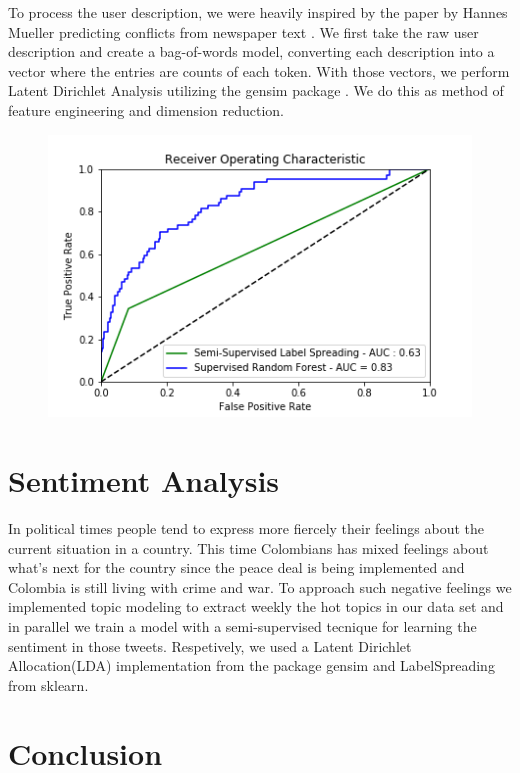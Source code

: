 \documentclass[10pt,a4paper]{article} %
\begin{document}
		To process the user description, we were heavily inspired by the paper by Hannes Mueller predicting conflicts from newspaper text \cite{mueller_rauh_2018}.  We first take the raw user description and create a bag-of-words model, converting each description into a vector where the entries are counts of each token.  With those vectors, we perform Latent Dirichlet Analysis utilizing the gensim package \cite{rehurek_lrec}.  We do this as method of feature engineering and dimension reduction.
		
		\begin{figure}[h]
			\includegraphics[width=0.9\linewidth]{roc_curve}
			\centering
		\end{figure}
	\section{Sentiment Analysis}
	In political times people tend to express more fiercely their feelings about the current situation in a country. This time Colombians has mixed feelings about what's next for the country since the peace deal is being implemented and Colombia is still living with crime and war. To approach such negative feelings we implemented topic modeling to extract weekly the hot topics in our data set and in parallel we train a model with a semi-supervised tecnique for learning the sentiment in those tweets. Respetively, we used a Latent Dirichlet Allocation(LDA) implementation from the package gensim and LabelSpreading from sklearn.
	\section{Conclusion}
	
	\nocite{*}
	
	
\end{document}
